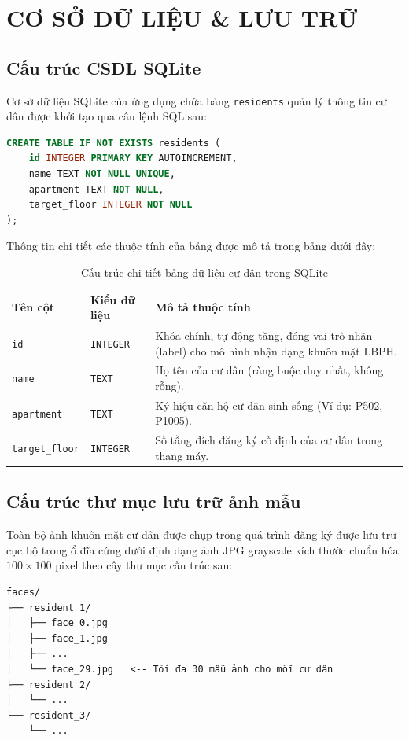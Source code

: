 \documentclass[12pt,a4paper]{article}
\begin{document}
\newpage

\section{CƠ SỞ DỮ LIỆU \& LƯU TRỮ}

\subsection{Cấu trúc CSDL SQLite}
Cơ sở dữ liệu SQLite của ứng dụng chứa bảng \texttt{residents} quản lý thông tin cư dân được khởi tạo qua câu lệnh SQL sau:
\begin{lstlisting}[language=SQL]
CREATE TABLE IF NOT EXISTS residents (
    id INTEGER PRIMARY KEY AUTOINCREMENT,
    name TEXT NOT NULL UNIQUE,
    apartment TEXT NOT NULL,
    target_floor INTEGER NOT NULL
);
\end{lstlisting}

Thông tin chi tiết các thuộc tính của bảng được mô tả trong bảng dưới đây:
\begin{table}[H]
    \centering
    \begin{tabular}{|l|l|p{9.5cm}|}
        \hline
        \textbf{Tên cột} & \textbf{Kiểu dữ liệu} & \textbf{Mô tả thuộc tính} \\ \hline
        \texttt{id} & \texttt{INTEGER} & Khóa chính, tự động tăng, đóng vai trò nhãn (label) cho mô hình nhận dạng khuôn mặt LBPH. \\ \hline
        \texttt{name} & \texttt{TEXT} & Họ tên của cư dân (ràng buộc duy nhất, không rỗng). \\ \hline
        \texttt{apartment} & \texttt{TEXT} & Ký hiệu căn hộ cư dân sinh sống (Ví dụ: P502, P1005). \\ \hline
        \texttt{target\_floor} & \texttt{INTEGER} & Số tầng đích đăng ký cố định của cư dân trong thang máy. \\ \hline
    \end{tabular}
    \caption{Cấu trúc chi tiết bảng dữ liệu cư dân trong SQLite}
    \label{tab:db_columns}
\end{table}

\subsection{Cấu trúc thư mục lưu trữ ảnh mẫu}
Toàn bộ ảnh khuôn mặt cư dân được chụp trong quá trình đăng ký được lưu trữ cục bộ trong ổ đĩa cứng dưới định dạng ảnh JPG grayscale kích thước chuẩn hóa $100 \times 100$ pixel theo cây thư mục cấu trúc sau:
\begin{verbatim}
faces/
├── resident_1/
│   ├── face_0.jpg
│   ├── face_1.jpg
│   ├── ...
│   └── face_29.jpg   <-- Tối đa 30 mẫu ảnh cho mỗi cư dân
├── resident_2/
│   └── ...
└── resident_3/
    └── ...
\end{verbatim}
\end{document}
